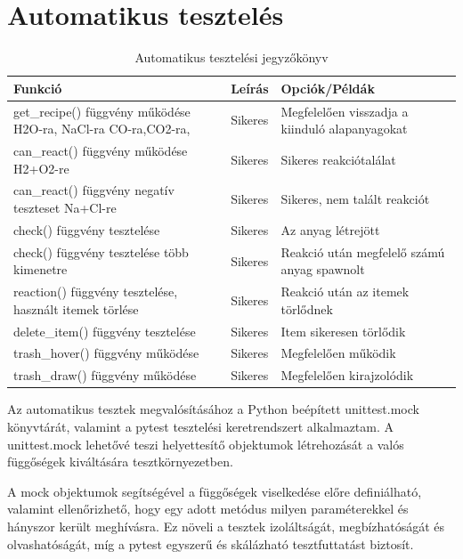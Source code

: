 \documentclass[]{thesis-ekf}
\begin{document}
	\section{Automatikus tesztelés}
	\begin{table}[ht!]
		\centering
		\footnotesize
		\begin{tabular}{|>{\centering}m{4.5cm}|>{\centering}m{3cm}|>{\centering\arraybackslash}m{7cm}|}
			\hline
			\textbf{Funkció} & \textbf{Leírás} & \textbf{Opciók/Példák} \\
			\hline
			get\_recipe() függvény működése  H2O-ra, NaCl-ra CO-ra,CO2-ra, & Sikeres & Megfelelően visszadja a kiinduló alapanyagokat \\
			\hline
			can\_react() függvény működése H2+O2-re & Sikeres & Sikeres reakciótalálat \\
			\hline
			can\_react() függvény negatív teszteset Na+Cl-re & Sikeres & Sikeres, nem talált reakciót \\
			\hline
			check() függvény tesztelése & Sikeres & Az anyag létrejött \\
			\hline
			check() függvény tesztelése több kimenetre & Sikeres & Reakció után megfelelő számú anyag spawnolt \\
			\hline
			reaction() függvény tesztelése, használt itemek törlése & Sikeres & Reakció után az itemek törlődnek \\
			\hline
			delete\_item() függvény tesztelése & Sikeres & Item sikeresen törlődik\\
			\hline
			trash\_hover() függvény működése & Sikeres & Megfelelően működik\\
			\hline
			trash\_draw() függvény működése & Sikeres & Megfelelően kirajzolódik\\
			\hline
		\end{tabular}
		\caption{Automatikus tesztelési jegyzőkönyv}
		\label{ATeszt-jegyzokonyv}
	\end{table}
	Az automatikus tesztek megvalósításához a Python beépített unittest.mock\cite{unittest_mock} könyvtárát, valamint a pytest\cite{pytest} tesztelési keretrendszert alkalmaztam. A unittest.mock lehetővé teszi helyettesítő objektumok létrehozását a valós függőségek kiváltására tesztkörnyezetben.
	
	A mock objektumok segítségével a függőségek viselkedése előre definiálható, valamint ellenőrizhető, hogy egy adott metódus milyen paraméterekkel és hányszor került meghívásra. Ez növeli a tesztek izoláltságát, megbízhatóságát és olvashatóságát, míg a pytest egyszerű és skálázható tesztfuttatást biztosít.
	
\end{document}
